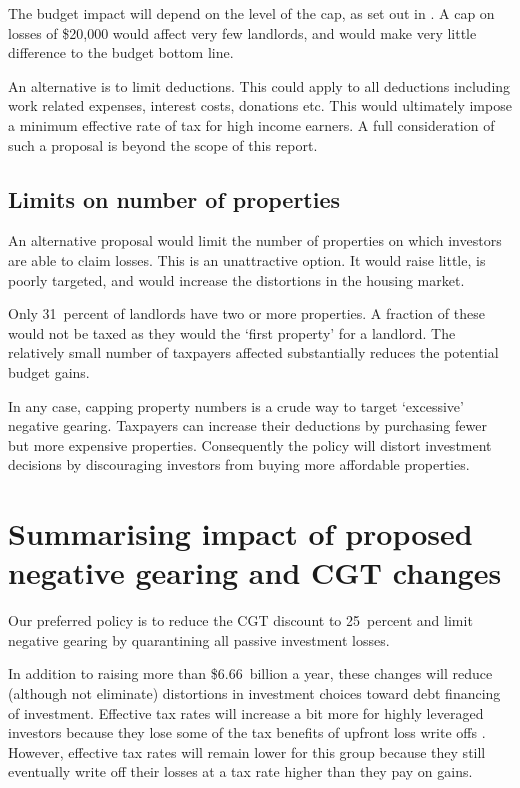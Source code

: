 \documentclass{grattan}\usepackage[]{graphicx}\usepackage[]{color}
\begin{document}
The budget impact will depend on the level of the cap, as set out in . A cap on losses of \$20,000  would affect very few landlords, and would make very little difference to the budget bottom line.

An alternative is to limit deductions. This could apply to all deductions including work related expenses, interest costs, donations etc. This would ultimately impose a minimum effective rate of tax for high income earners.   A full consideration of such a proposal is beyond the scope of this report. 

\subsection{Limits on number of properties}
An alternative proposal would limit the number of properties on which investors are able to claim losses.  This is an unattractive option. It would raise little, is poorly targeted, and would increase the distortions in the housing market.



Only 31~percent of landlords have two or more properties.  A fraction of these would not be taxed as they would the `first property' for a landlord. The relatively small number of taxpayers affected substantially reduces the potential budget gains. 

In any case, capping property numbers is a crude way to target `excessive' negative gearing. Taxpayers can increase their deductions by purchasing fewer but more expensive properties. Consequently the policy will distort investment decisions by discouraging investors from buying more affordable properties. 

\section{Summarising impact of proposed negative gearing and CGT changes}
Our preferred policy is to reduce the CGT discount to 25~percent and limit negative gearing by quarantining all passive investment losses. 

In addition to raising more than \$6.66~billion a year, these changes will reduce (although not eliminate) distortions in investment choices toward debt financing of investment. Effective tax rates will increase a bit more for highly leveraged investors because they lose some of the tax benefits of upfront loss write offs . However, effective tax rates will remain lower for this group because they still eventually write off their losses at a tax rate higher than they pay on gains. 
\end{document}

